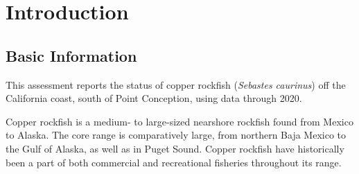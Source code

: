 \documentclass[11pt,
  english,
  a4paper,
]{article}
\begin{document}
\newcommand{\lt}{\ensuremath <}
\newcommand{\gt}{\ensuremath >}

\setcounter{page}{1}

\renewcommand{\thetable}{\roman{table}}
\renewcommand{\thefigure}{\roman{figure}}

\setlength\parskip{0.5em plus 0.1em minus 0.2em}

\vspace{500cm}

\pagebreak

\pagebreak
\setlength{\parskip}{5mm plus1mm minus1mm}
\setcounter{page}{1}
\renewcommand{\thefigure}{\arabic{figure}}
\renewcommand{\thetable}{\arabic{table}}

\setcounter{table}{0}
\setcounter{figure}{0}

\setlength\parskip{0.5em plus 0.1em minus 0.2em}


\hypertarget{introduction}{%
\section{Introduction}\label{introduction}}

\leavevmode\tagmcend\tagstructend


\hypertarget{basic-information}{%
\subsection{Basic Information}\label{basic-information}}

\leavevmode\tagmcend\tagstructend


This assessment reports the status of copper rockfish (\emph{Sebastes caurinus}) off the California coast, south of Point Conception, using data through 2020.

\leavevmode\tagmcend\tagstructend\par


Copper rockfish is a medium- to large-sized nearshore rockfish found from Mexico to Alaska. The core range is comparatively large, from northern Baja Mexico to the Gulf of Alaska, as well as in Puget Sound. Copper rockfish have historically been a part of both commercial and recreational fisheries throughout its range.
\end{document}
